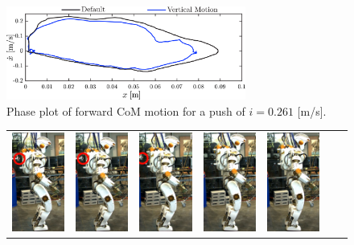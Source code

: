 \begin{figure}
\centering
\includegraphics[width=0.7\textwidth]{STYLESTUFF/valcomparephaseHW.png}
\caption{Phase plot of forward \ac{CoM} motion for a push of $i=0.261$ [m/s].}
\label{fig:valcomparephaseHW}
\end{figure}
\begin{figure}
\centering
  \begin{tabular}{ccccccc}
    \includegraphics[width=0.7in]{STYLESTUFF/val1zr_C} &
    \includegraphics[width=0.7in]{STYLESTUFF/val2zr_30} &
    \includegraphics[width=0.7in]{STYLESTUFF/val3zr_30} &
    \includegraphics[width=0.7in]{STYLESTUFF/val4z_30} &
    \includegraphics[width=0.7in]{STYLESTUFF/val5z_30} &

\end{tabular}
\end{figure}
